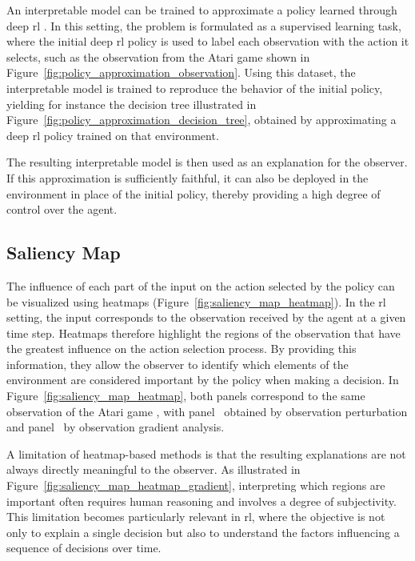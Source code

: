 An interpretable model can be trained to approximate a policy learned through deep \gls{rl} \parencite{sieusahai2021explaining}.
In this setting, the problem is formulated as a supervised learning task, where the initial deep \gls{rl} policy is used to label each observation with the action it selects, such as the observation from the Atari game \PongName shown in Figure~\ref{fig:policy_approximation_observation}.
Using this dataset, the interpretable model is trained to reproduce the behavior of the initial policy, yielding for instance the decision tree illustrated in Figure~\ref{fig:policy_approximation_decision_tree}, obtained by approximating a deep \gls{rl} policy trained on that environment.

The resulting interpretable model is then used as an explanation for the observer.
If this approximation is sufficiently faithful, it can also be deployed in the environment in place of the initial policy, thereby providing a high degree of control over the agent.



\subsection{Saliency Map}
\label{subsec:saliency_map}

The influence of each part of the input on the action selected by the policy can be visualized using heatmaps (Figure~\ref{fig:saliency_map_heatmap}).
In the \gls{rl} setting, the input corresponds to the observation received by the agent at a given time step.
Heatmaps therefore highlight the regions of the observation that have the greatest influence on the action selection process.
By providing this information, they allow the observer to identify which elements of the environment are considered important by the policy when making a decision.
In Figure~\ref{fig:saliency_map_heatmap}, both panels correspond to the same observation of the Atari game \BreakoutName, with panel~ obtained by observation perturbation and panel~ by observation gradient analysis.



A limitation of heatmap-based methods is that the resulting explanations are not always directly meaningful to the observer.
As illustrated in Figure~\ref{fig:saliency_map_heatmap_gradient}, interpreting which regions are important often requires human reasoning and involves a degree of subjectivity.
This limitation becomes particularly relevant in \gls{rl}, where the objective is not only to explain a single decision but also to understand the factors influencing a sequence of decisions over time.

